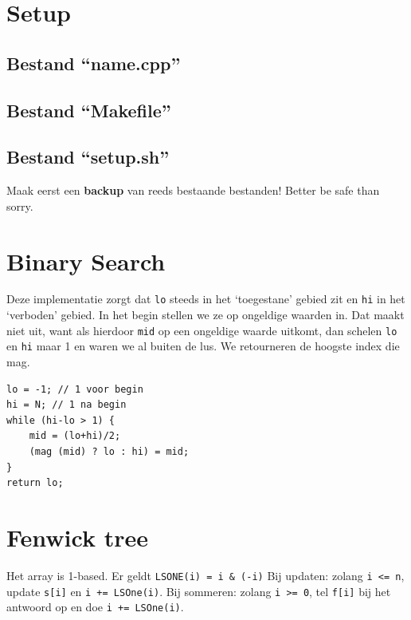 \documentclass[10pt,a4paper,titlepage]{article}
\begin{document}
\section{Setup}
\iftrue
\subsection{Bestand ``name.cpp''}
\begin{multicols}{2}

\end{multicols}
\fi

\iftrue
\subsection{Bestand ``Makefile''}


\subsection{Bestand ``setup.sh''}
Maak eerst een \textbf{backup} van reeds bestaande bestanden! Better be safe than sorry.

\fi

\iftrue
\section{Binary Search}

Deze implementatie zorgt dat \verb|lo| steeds in het `toegestane' gebied zit en \verb|hi| in het `verboden' gebied. In het begin stellen we ze op ongeldige waarden in. Dat maakt niet uit, want als hierdoor \verb|mid| op een ongeldige waarde uitkomt, dan schelen \verb|lo| en \verb|hi| maar 1 en waren we al buiten de lus. We retourneren de hoogste index die mag.
\begin{lstlisting}
lo = -1; // 1 voor begin
hi = N; // 1 na begin
while (hi-lo > 1) {
	mid = (lo+hi)/2;
	(mag (mid) ? lo : hi) = mid;
}
return lo;
\end{lstlisting}
\fi

\section{Fenwick tree}

Het array is 1-based. Er geldt \verb.LSONE(i) = i & (-i). Bij updaten: zolang \verb.i <= n., update \verb.s[i]. en \verb.i += LSOne(i).. Bij sommeren: zolang \verb.i >= 0., tel \verb.f[i]. bij het antwoord op en doe \verb.i += LSOne(i)..
\end{document}
